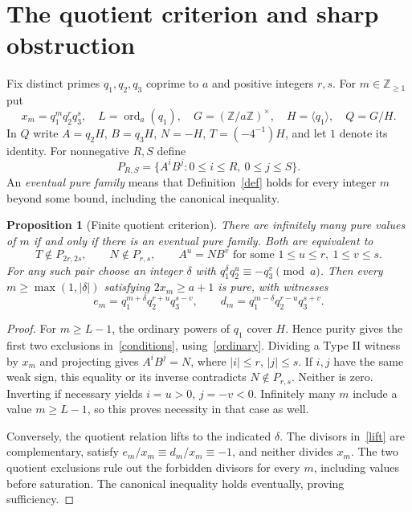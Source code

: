 \documentclass[11pt,a4paper]{article}
\newtheorem{proposition}[theorem]{Proposition}
\theoremstyle{definition}\newtheorem{definition}[theorem]{Definition}
\newcommand{\Z}{\mathbb Z}
\newcommand{\ord}{\operatorname{ord}}
\begin{document}
\section{The quotient criterion and sharp obstruction}
Fix distinct primes $q_1,q_2,q_3$ coprime to $a$ and positive integers $r,s$. For $m\in\Z_{\ge1}$ put
\[
x_m=q_1^m q_2^r q_3^s,\quad L=\ord_a(q_1),\quad
G=(\Z/a\Z)^\times,\quad H=\langle q_1\rangle,\quad Q=G/H.
\]
In $Q$ write $A=q_2H$, $B=q_3H$, $N=-H$, $T=(-4^{-1})H$, and let $1$ denote its identity. For nonnegative $R,S$ define
\[
P_{R,S}=\{A^iB^j:0\le i\le R,\ 0\le j\le S\}.
\]
An \emph{eventual pure family} means that Definition~\ref{def} holds for every integer $m$ beyond some bound, including the canonical inequality.

\begin{proposition}[Finite quotient criterion]\label{criterion}
There are infinitely many pure values of $m$ if and only if there is an eventual pure family. Both are equivalent to
\begin{equation}\label{conditions}
T\notin P_{2r,2s},\qquad N\notin P_{r,s},\qquad
A^u=NB^v\text{ for some }1\le u\le r,\ 1\le v\le s.
\end{equation}
For any such pair choose an integer $\delta$ with
$q_1^\delta q_2^u\equiv-q_3^v\pmod a$.
Then every $m\ge\max(1,|\delta|)$ satisfying $2x_m\ge a+1$ is pure, with witnesses
\begin{equation}\label{lift}
e_m=q_1^{m+\delta}q_2^{r+u}q_3^{s-v},\qquad
d_m=q_1^{m-\delta}q_2^{r-u}q_3^{s+v}.
\end{equation}
\end{proposition}
\begin{proof}
For $m\ge L-1$, the ordinary powers of $q_1$ cover $H$. Hence purity gives the first two exclusions in~\eqref{conditions}, using~\eqref{ordinary}. Dividing a Type II witness by $x_m$ and projecting gives $A^iB^j=N$, where $|i|\le r$, $|j|\le s$. If $i,j$ have the same weak sign, this equality or its inverse contradicts $N\notin P_{r,s}$. Neither is zero. Inverting if necessary yields $i=u>0$, $j=-v<0$. Infinitely many $m$ include a value $m\ge L-1$, so this proves necessity in that case as well.

Conversely, the quotient relation lifts to the indicated $\delta$. The divisors in~\eqref{lift} are complementary, satisfy $e_m/x_m\equiv d_m/x_m\equiv-1$, and neither divides $x_m$. The two quotient exclusions rule out the forbidden divisors for every $m$, including values before saturation. The canonical inequality holds eventually, proving sufficiency.
\end{proof}
\end{document}
